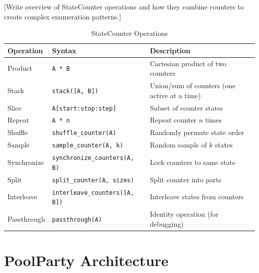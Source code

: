 \documentclass[11pt]{article}
\begin{document}
%

[Write overview of StateCounter operations and how they combine counters 
to create complex enumeration patterns.]


\begin{table}[htbp]
\centering
\caption{StateCounter Operations}
\label{tab:statecounter-ops}
\begin{tabular}{@{}lll@{}}
\toprule
\textbf{Operation} & \textbf{Syntax} & \textbf{Description} \\
\midrule
Product & \texttt{A * B} & Cartesian product of two counters \\
Stack & \texttt{stack([A, B])} & Union/sum of counters (one active at a time) \\
Slice & \texttt{A[start:stop:step]} & Subset of counter states \\
Repeat & \texttt{A * n} & Repeat counter $n$ times \\
Shuffle & \texttt{shuffle_counter(A)} & Randomly permute state order \\
Sample & \texttt{sample_counter(A, k)} & Random sample of $k$ states \\
Synchronize & \texttt{synchronize_counters(A, B)} & Lock counters to same state \\
Split & \texttt{split_counter(A, sizes)} & Split counter into parts \\
Interleave & \texttt{interleave_counters([A, B])} & Interleave states from counters \\
Passthrough & \texttt{passthrough(A)} & Identity operation (for debugging) \\
\bottomrule
\end{tabular}
\end{table}



\section{PoolParty Architecture}
\label{sec:poolparty-architecture}
\end{document}
